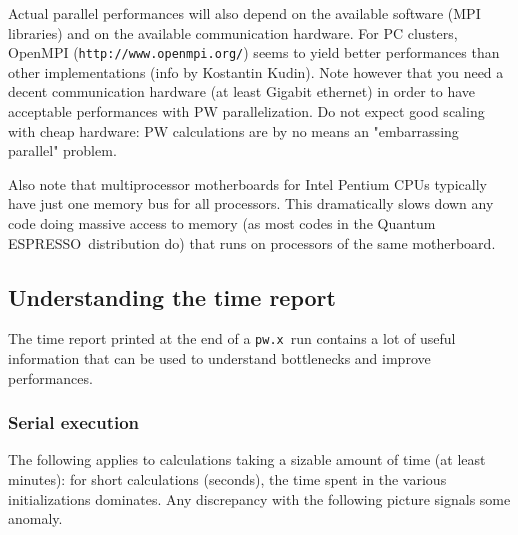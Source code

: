 \documentclass[12pt,a4paper]{article}
\def\qe{{\sc Quantum ESPRESSO}}
\def\pwx{\texttt{pw.x}}
\begin{document}
Actual parallel performances will also depend on the available software 
(MPI libraries) and on the available communication hardware. For
PC clusters, OpenMPI (\texttt{http://www.openmpi.org/}) seems to yield better 
performances than other implementations (info by Kostantin Kudin). 
Note however that you need a decent communication hardware (at least 
Gigabit ethernet) in order to have acceptable performances with 
PW parallelization. Do not expect good scaling with cheap hardware: 
PW calculations are by no means an "embarrassing parallel" problem.
   
Also note that multiprocessor motherboards for Intel Pentium CPUs typically 
have just one memory bus for all processors. This dramatically
slows down any code doing massive access to memory (as most codes 
in the \qe\ distribution do) that runs on processors of the same
motherboard.

\subsection{Understanding the time report}

The time report printed at the end of a \pwx\ run contains a lot of useful 
information that can be used to understand bottlenecks and improve 
performances.

\subsubsection{Serial execution}
The following applies to calculations taking a sizable amount of time
(at least minutes): for short calculations (seconds), the time spent in 
the various initializations dominates. Any discrepancy with the following
picture signals some anomaly.
\end{document}
